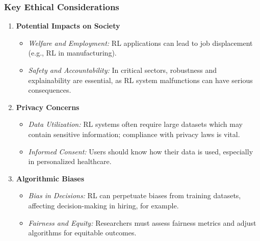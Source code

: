 \documentclass[aspectratio=169]{beamer}
\begin{document}
\begin{frame}[fragile]
    \frametitle{Key Ethical Considerations}
    \begin{enumerate}
        \item \textbf{Potential Impacts on Society}
        \begin{itemize}
            \item \textit{Welfare and Employment:} RL applications can lead to job displacement (e.g., RL in manufacturing).
            \item \textit{Safety and Accountability:} In critical sectors, robustness and explainability are essential, as RL system malfunctions can have serious consequences.
        \end{itemize}

        \item \textbf{Privacy Concerns}
        \begin{itemize}
            \item \textit{Data Utilization:} RL systems often require large datasets which may contain sensitive information; compliance with privacy laws is vital.
            \item \textit{Informed Consent:} Users should know how their data is used, especially in personalized healthcare.
        \end{itemize}

        \item \textbf{Algorithmic Biases}
        \begin{itemize}
            \item \textit{Bias in Decisions:} RL can perpetuate biases from training datasets, affecting decision-making in hiring, for example.
            \item \textit{Fairness and Equity:} Researchers must assess fairness metrics and adjust algorithms for equitable outcomes.
        \end{itemize}
    \end{enumerate}
\end{frame}
\end{document}
